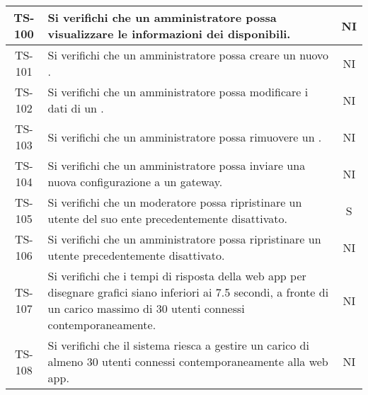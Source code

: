 \begin{center}
\begin{longtable}{|c|p{10cm}|c|}
			 \hline
			 TS-100 & Si verifichi che un amministratore possa visualizzare le informazioni dei \glock{gateway} disponibili. & NI \\
			 \hline
			 TS-101 & Si verifichi che un amministratore possa creare un nuovo \glock{gateway}. & NI \\
			 \hline
			 TS-102 & Si verifichi che un amministratore possa modificare i dati di un \glock{gateway}. & NI \\
			 \hline
			 TS-103 & Si verifichi che un amministratore possa rimuovere un \glock{gateway}. & NI \\
			 \hline
			 TS-104 & Si verifichi che un amministratore possa inviare una nuova configurazione a un gateway. & NI \\
			 \hline
			 TS-105 & Si verifichi che un moderatore possa ripristinare un utente del suo ente precedentemente disattivato. & S \\
			 \hline
			 TS-106 & Si verifichi che un amministratore possa ripristinare un utente precedentemente disattivato. & NI \\
			 \hline
			 TS-107 & Si verifichi che i tempi di risposta della web app per disegnare grafici siano inferiori ai 7.5 secondi, a fronte di un carico massimo di 30 utenti connessi contemporaneamente. & NI \\
			 \hline
			 TS-108 & Si verifichi che il sistema riesca a gestire un carico di almeno 30 utenti connessi contemporaneamente alla web app. & NI \\
			 \hline

\end{longtable}
\end{center}
